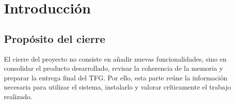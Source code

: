 \chapter{Introducción}

\begin{abstract}
Esta parte recoge el cierre del proyecto desde el punto de vista documental y operativo.
Se incluyen los materiales de uso e instalación, junto con la reflexión final sobre el
resultado obtenido y las posibles líneas de continuidad del trabajo.
\end{abstract}

\section{Propósito del cierre}
El cierre del proyecto no consiste en añadir nuevas funcionalidades, sino en consolidar el
producto desarrollado, revisar la coherencia de la memoria y preparar la entrega final del
TFG. Por ello, esta parte reúne la información necesaria para utilizar el sistema,
instalarlo y valorar críticamente el trabajo realizado.
